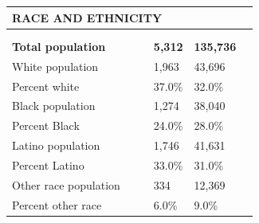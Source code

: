 \documentclass[9pt]{report}
\begin{document}
\vspace{12pt}
\setlength{\tabcolsep}{.01in} %
\begin{tabular}{p{.10in}p{.10in}p{.10in}p{3.7in}>{\hfill}p{.85in}>{\hfill}p{.85in}>{\hfill}p{.85in}>{\hfill}p{.85in}p{0.1in}}
\multicolumn{9}{l}{\parbox{7.1in}{\raggedright{\large{\strut\textbf{RACE AND ETHNICITY}\strut}}}} \\ 
\hline
\multicolumn{4}{l}{\parbox{3.5in}{\raggedright{\textbf{}}}} & \multicolumn{1}{r}{\parbox{.85in}{\strut\raggedleft{\textbf{}\strut}}} & \multicolumn{1}{r}{\parbox{.85in}{\strut\raggedleft{\textbf{}\strut}}} & \multicolumn{1}{r}{\parbox{.85in}{\strut{}}} & \multicolumn{1}{r}{\parbox{.85in}{\strut{}}} & \\ 
\multicolumn{9}{l}{} \\ 
\multicolumn{4}{l}{\parbox{3.5in}{\strut\raggedright{\textbf{Total population}\strut}}} & \textbf{} & \textbf{} & \textbf{5,312} & \textbf{135,736} & \textbf{} \\ 
\multicolumn{4}{l}{\parbox{3.6in}{\strut\raggedright{{White population}}\strut}} &  &  & 1,963 & 43,696 & \multicolumn{1}{l}{}  \\ 
\multicolumn{4}{l}{\parbox{3.6in}{\strut\raggedright{{Percent white}}\strut}} &  &  & 37.0\% & 32.0\% & \multicolumn{1}{l}{}  \\ 
\multicolumn{4}{l}{\parbox{3.6in}{\strut\raggedright{{Black population}}\strut}} &  &  & 1,274 & 38,040 & \multicolumn{1}{l}{}  \\ 
\multicolumn{4}{l}{\parbox{3.6in}{\strut\raggedright{{Percent Black}}\strut}} &  &  & 24.0\% & 28.0\% & \multicolumn{1}{l}{}  \\ 
\multicolumn{4}{l}{\parbox{3.6in}{\strut\raggedright{{Latino population}}\strut}} &  &  & 1,746 & 41,631 & \multicolumn{1}{l}{}  \\ 
\multicolumn{4}{l}{\parbox{3.6in}{\strut\raggedright{{Percent Latino}}\strut}} &  &  & 33.0\% & 31.0\% & \multicolumn{1}{l}{}  \\ 
\multicolumn{4}{l}{\parbox{3.6in}{\strut\raggedright{{Other race population}}\strut}} &  &  & 334 & 12,369 & \multicolumn{1}{l}{}  \\ 
\multicolumn{4}{l}{\parbox{3.6in}{\strut\raggedright{{Percent other race}}\strut}} &  &  & 6.0\% & 9.0\% & \multicolumn{1}{l}{}  \\ 

\end{tabular}
\setlength{\tabcolsep}{6pt} %
\end{document}
